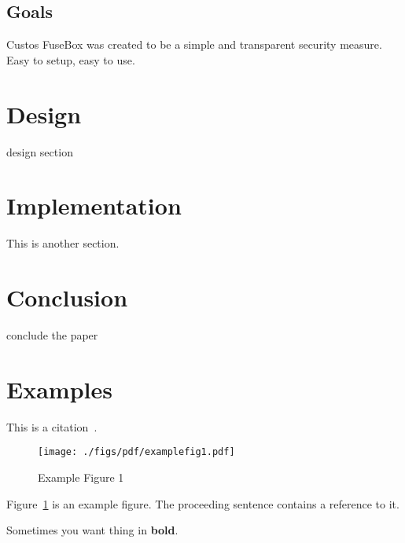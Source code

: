 \documentclass[11pt,twocolumn,letterpaper]{article}
\newcommand{\appname}{Custos FuseBox }
\begin{document}
\subsection{Goals}
\label{sec:goals}
\appname was created to be a simple and transparent security
measure. Easy to setup, easy to use. 

\section{Design}
\label{sec:design}

design section

\section{Implementation}
\label{sec:implementation}

This is another section.


\section{Conclusion}
\label{sec:conclusion}

conclude the paper

\section{Examples}
\label{sec:ex}

\noindent
This is a citation~\cite{exampleref1}.



\begin{figure}[htb]
  \centering
  \texttt{[image: ./figs/pdf/examplefig1.pdf]}
  \caption{Example Figure 1}
  \label{fig:example1}
\end{figure}

\noindent
Figure~\ref{fig:example1} is an example figure. The proceeding
sentence contains a reference to it.

\noindent
Sometimes you want thing in {\bf bold}.
\end{document}
